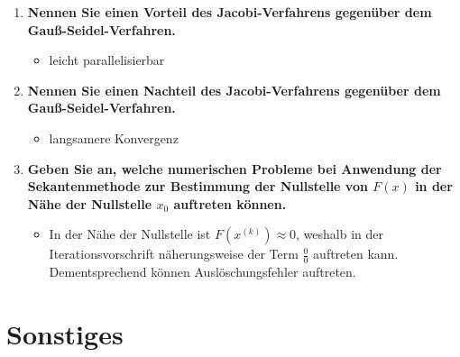 \documentclass[german]{latex4ei/latex4ei_sheet}
\begin{document}
\begin{sectionbox}
\begin{enumerate}
	\item \textbf{Nennen Sie einen Vorteil des Jacobi-Verfahrens gegenüber dem Gauß-Seidel-Verfahren.}
	\begin{itemize}
		\item leicht parallelisierbar
	\end{itemize}

	\item \textbf{Nennen Sie einen Nachteil des Jacobi-Verfahrens gegenüber dem Gauß-Seidel-Verfahren.}
	\begin{itemize}
		\item langsamere Konvergenz
	\end{itemize}

	\item \textbf{Geben Sie an, welche numerischen Probleme bei Anwendung der Sekantenmethode zur Bestimmung der Nullstelle von $F(x)$ in der Nähe der Nullstelle $x_0$ auftreten können.}
	\begin{itemize}
		\item In der Nähe der Nullstelle ist $F(x^{(k)}) \approx 0$, weshalb in der Iterationsvorschrift näherungsweise der Term $\frac{0}{0}$ auftreten kann. Dementsprechend können Auslöschungsfehler auftreten.
	\end{itemize}

\end{enumerate}

\end{sectionbox}




\section{Sonstiges}
\end{document}
